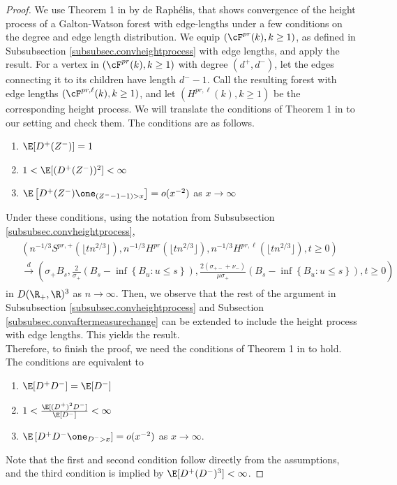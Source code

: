 \begin{proof}
We use Theorem 1 in \cite{Deraphelis2017} by de Raphélis, that shows convergence of the height process of a Galton-Watson forest with edge-lengths under a few conditions on the degree and edge length distribution. We equip $(\cF^{pr}(k),k\geq 1)$, as defined in Subsubsection \ref{subsubsec.convheightprocess} with edge lengths, and apply the result. For a vertex in $(\cF^{pr}(k),k\geq 1)$ with degree $(d^+,d^-)$, let the edges connecting it to its children have length $d^--1$. Call the resulting forest with edge lengths $(\cF^{pr,\ell}(k),k\geq 1)$, and let $(H^{pr,\ell}(k),k\geq 1)$ be the corresponding height process.   We will translate the conditions of Theorem 1 in \cite{Deraphelis2017} to our setting and check them. The conditions are as follows.
\begin{enumerate}
    \item $\E[D^+(Z^-)]=1$
    \item $1<\E[(D^+(Z^-))^2]<\infty$
    \item $\E\left[D^+(Z^-)\one_{(Z^--1-1)>x}\right]=o(x^{-2})$ as $x\to \infty$
\end{enumerate}
Under these conditions, using the notation from Subsubsection \ref{subsubsec.convheightprocess},
\begin{align}\begin{split}\label{eq.convmodifiedheightprocess}
&\left(n^{-1/3}S^{pr,+}\left(\lfloor t n^{2/3}\rfloor \right),n^{-1/3}H^{pr}\left(\lfloor t n^{2/3}\rfloor \right), n^{-1/3}H^{pr,\ell}\left(\lfloor t n^{2/3}\rfloor \right),t\geq 0\right)\\
&\overset{d}{\to}\left(\sigma_+ B_s, \frac{2}{\sigma_+}\left(B_s-\inf\left\{B_u:u\leq s\right\}\right), \frac{2(\sigma_{+-}+\nu_-)}{\mu\sigma_+}\left(B_s-\inf\left\{B_u:u\leq s\right\}\right),t\geq 0\right)
\end{split}\end{align}
in $D(\R_+,\R)^3$ as $n\to \infty$. 
Then, we observe that the rest of the argument in Subsubsection \ref{subsubsec.convheightprocess} and Subsection \ref{subsubsec.convaftermeasurechange} can be extended to include the height process with edge lengths. This yields the result.\\
Therefore, to finish the proof, we need the conditions of Theorem 1 in \cite{Deraphelis2017} to hold. The conditions are equivalent to 
\begin{enumerate}
    \item $\E[D^+D^-]=\E[D^-]$
    \item $1<\frac{\E[(D^+)^2D^-]}{\E[D^-]}<\infty$
    \item $\E\left[D^+D^-\one_{D^->x}\right]=o(x^{-2})$ as $x\to \infty$. 
\end{enumerate}
Note that the first and second condition follow directly from the assumptions, and the third condition is implied by $\E[D^+(D^-)^3]<\infty$.
\end{proof}\\

